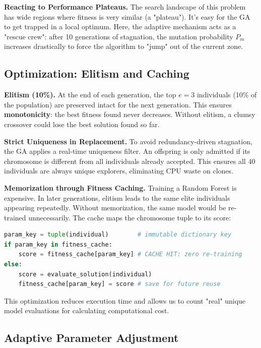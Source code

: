 \documentclass[12pt, a4paper]{article}
\begin{document}
\textbf{Reacting to Performance Plateaus.} The search landscape of this problem has wide
regions where fitness is very similar (a "plateau"). It's easy for the GA to get trapped
in a local optimum. Here, the adaptive mechanism acts as a "rescue crew": after 10
generations of stagnation, the mutation probability $P_m$ increases drastically to
force the algorithm to "jump" out of the current zone.

\subsection{Optimization: Elitism and Caching}

\textbf{Elitism (10\%).} At the end of each generation, the top $e=3$ individuals
(10\% of the population) are preserved intact for the next generation. This ensures
\textbf{monotonicity}: the best fitness found never decreases. Without elitism, a
clumsy crossover could lose the best solution found so far.

\textbf{Strict Uniqueness in Replacement.} To avoid redundancy-driven stagnation, the
GA applies a real-time uniqueness filter. An offspring is only admitted if its
chromosome is different from all individuals already accepted. This ensures all 40
individuals are always unique explorers, eliminating CPU waste on clones.

\textbf{Memorization through Fitness Caching.} Training a Random Forest is expensive.
In later generations, elitism leads to the same elite individuals appearing repeatedly.
Without memorization, the same model would be re-trained unnecessarily. The cache
maps the chromosome tuple to its score:

\begin{lstlisting}[language=Python, caption={Fitness memorization mechanism}]
param_key = tuple(individual)        # immutable dictionary key
if param_key in fitness_cache:
    score = fitness_cache[param_key] # CACHE HIT: zero re-training
else:
    score = evaluate_solution(individual)
    fitness_cache[param_key] = score # save for future reuse
\end{lstlisting}

This optimization reduces execution time and allows us to count "real" unique model
evaluations for calculating computational cost.

\subsection{Adaptive Parameter Adjustment}
\end{document}
